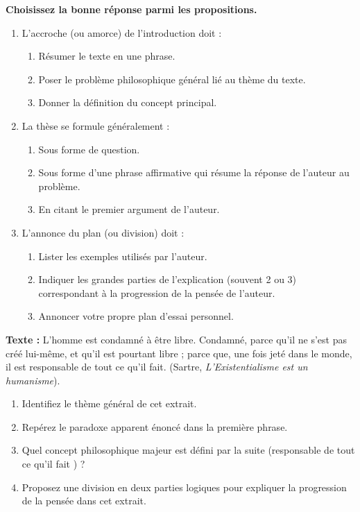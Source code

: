 \documentclass[11pt]{article}
\begin{document}
\begin{exercice}
\textbf{Choisissez la bonne réponse parmi les propositions.}
\begin{enumerate}
    \item L'accroche (ou amorce) de l'introduction doit :
    \begin{enumerate}
        \item Résumer le texte en une phrase.
        \item Poser le problème philosophique général lié au thème du texte.
        \item Donner la définition du concept principal.
    \end{enumerate}
    \item La \og thèse \fg{} se formule généralement :
    \begin{enumerate}
        \item Sous forme de question.
        \item Sous forme d'une phrase affirmative qui résume la réponse de l'auteur au problème.
        \item En citant le premier argument de l'auteur.
    \end{enumerate}
    \item L'\og annonce du plan \fg{} (ou division) doit :
    \begin{enumerate}
        \item Lister les exemples utilisés par l'auteur.
        \item Indiquer les grandes parties de l'explication (souvent 2 ou 3) correspondant à la progression de la pensée de l'auteur.
        \item Annoncer votre propre plan d'essai personnel.
    \end{enumerate}
\end{enumerate}
\end{exercice}

\begin{exercice}
\textbf{Texte :} \og{} L'homme est condamné à être libre. Condamné, parce qu'il ne s'est pas créé lui-même, et qu'il est pourtant libre ; parce que, une fois jeté dans le monde, il est responsable de tout ce qu'il fait. \fg{} (Sartre, \textit{L'Existentialisme est un humanisme}).

\begin{enumerate}
    \item Identifiez le thème général de cet extrait.
    \item Repérez le paradoxe apparent énoncé dans la première phrase.
    \item Quel concept philosophique majeur est défini par la suite (\og responsable de tout ce qu'il fait \fg{}) ?
    \item Proposez une division en deux parties logiques pour expliquer la progression de la pensée dans cet extrait.
\end{enumerate}
\end{exercice}
\end{document}
